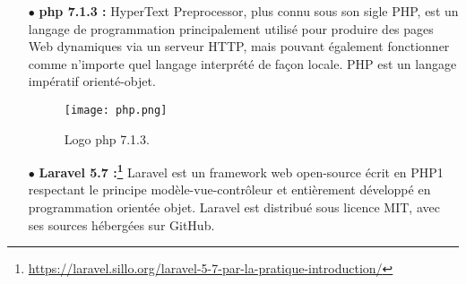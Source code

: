 \begin{itemize}
\begin{itemize}
	L’interface de GitHub est suffisamment conviviale pour que même les codeurs débutants puissent profiter de Git. Sans GitHub, l’utilisation de Git nécessite généralement un peu plus de connaissances techniques et l’utilisation de la ligne de commande.

\end{itemize}



\begin{figure}[ht]
	\centering
	\texttt{[image: git.jpg]}
	\caption{Logo GIT et GitHub.}
	\label{fig:GIT et GitHub }
\end{figure}
\FloatBarrier

\begin{figure}[ht]
	\centering
	\texttt{[image: lms.png]}
	\caption{Exemple 1.}
	\label{fig:Exemple1}
\end{figure}
\FloatBarrier
\begin{figure}[ht]
	\centering
	\texttt{[image: 6\_github.png]}
	\caption{Exemple 2.}
	\label{fig:Exemple2 }
\end{figure}
\FloatBarrier
\medskip


\clearpage

\begin{figure}[ht]
	\centering
	\texttt{[image: githubjgjmkh.png]}
	\caption{Exemple 3.}
	\label{fig:Exemple3 }
\end{figure}
\FloatBarrier
\medskip
\clearpage
	\item[$\bullet$] \textbf{ php 7.1.3 :} 
HyperText Preprocessor, plus connu sous
son sigle PHP, est un langage de programmation
principalement utilisé pour produire des pages Web
dynamiques via un serveur HTTP, mais pouvant
également fonctionner comme n'importe quel
langage interprété de façon locale. PHP est un
langage impératif orienté-objet.\cite{wiki:PHP}
\begin{figure}[ht]
	\centering
	\texttt{[image: php.png]}
	\caption{Logo php 7.1.3.}
	\label{fig:Logo php }
\end{figure}
\FloatBarrier





	\item[$\bullet$] \textbf{ Laravel 5.7 :\footnote{ \url{https://laravel.sillo.org/laravel-5-7-par-la-pratique-introduction/} }} 
Laravel est un framework web open-source écrit en PHP1 respectant le principe modèle-vue-contrôleur et entièrement développé en programmation orientée objet. Laravel est distribué sous licence MIT, avec ses sources hébergées sur GitHub.


\end{itemize}
